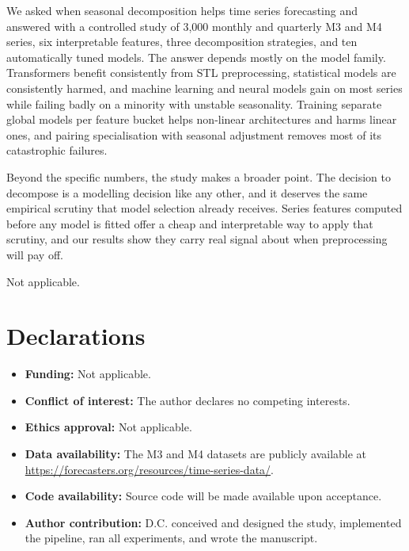 \documentclass[pdflatex,sn-mathphys-num]{sn-jnl}
\theoremstyle{thmstyleone}
\theoremstyle{thmstyletwo}
\theoremstyle{thmstylethree}
\begin{document}
We asked when seasonal decomposition helps time series forecasting and
answered with a controlled study of 3{,}000 monthly and quarterly M3 and M4
series, six interpretable features, three decomposition strategies, and ten
automatically tuned models. The answer depends mostly on the model family.
Transformers benefit consistently from STL preprocessing, statistical models
are consistently harmed, and machine learning and neural models gain on most
series while failing badly on a minority with unstable seasonality. Training
separate global models per feature bucket helps non-linear architectures and
harms linear ones, and pairing specialisation with seasonal adjustment removes
most of its catastrophic failures.

Beyond the specific numbers, the study makes a broader point. The decision to
decompose is a modelling decision like any other, and it deserves the same
empirical scrutiny that model selection already receives. Series features
computed before any model is fitted offer a cheap and interpretable way to
apply that scrutiny, and our results show they carry real signal about when
preprocessing will pay off.

\backmatter

Not applicable.

\section*{Declarations}

\begin{itemize}
  \item \textbf{Funding:} Not applicable.
  \item \textbf{Conflict of interest:} The author declares no competing interests.
  \item \textbf{Ethics approval:} Not applicable.
  \item \textbf{Data availability:} The M3 and M4 datasets are publicly available
    at \url{https://forecasters.org/resources/time-series-data/}.
  \item \textbf{Code availability:} Source code will be made available upon
    acceptance.
  \item \textbf{Author contribution:} D.C. conceived and designed the study,
    implemented the pipeline, ran all experiments, and wrote the manuscript.
\end{itemize}


\end{document}
